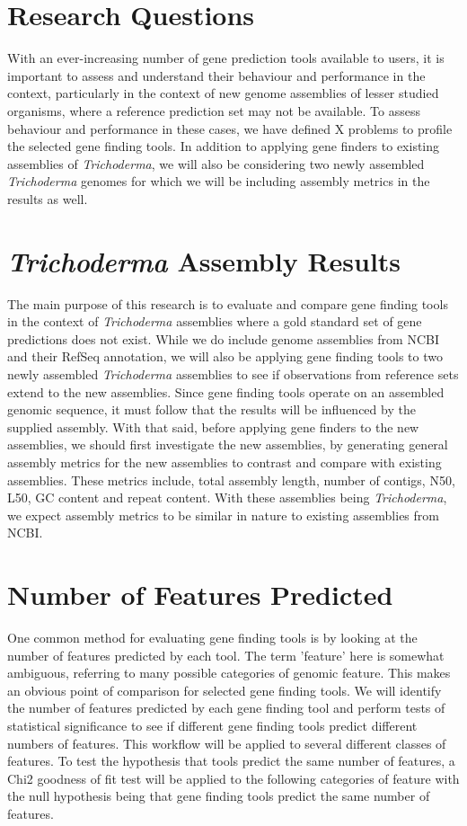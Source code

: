 \section{Research Questions}

With an ever-increasing number of gene prediction tools available to
users, it is important to assess and understand their behaviour and
performance in the context, particularly in the context of new genome
assemblies of lesser studied organisms, where a reference prediction
set may not be available. To assess behaviour and performance in these
cases, we have defined X problems to profile the selected gene finding
tools. In addition to applying gene finders to existing assemblies of
\textit{Trichoderma}, we will also be considering two newly assembled
\textit{Trichoderma} genomes for which we will be including assembly
metrics in the results as well.

\section{\textit{Trichoderma} Assembly Results}

The main purpose of this research is to evaluate and compare gene
finding tools in the context of \textit{Trichoderma} assemblies where
a gold standard set of gene predictions does not exist. While we do
include genome assemblies from NCBI and their RefSeq annotation, we
will also be applying gene finding tools to two newly assembled
\textit{Trichoderma} assemblies to see if observations from reference
sets extend to the new assemblies. Since gene finding tools operate on
an assembled genomic sequence, it must follow that the results will be
influenced by the supplied assembly. With that said, before applying
gene finders to the new assemblies, we should first investigate the
new assemblies, by generating general assembly metrics for the new
assemblies to contrast and compare with existing assemblies. These
metrics include, total assembly length, number of contigs, N50, L50,
GC content and repeat content. With these assemblies being
\textit{Trichoderma}, we expect assembly metrics to be similar in
nature to existing assemblies from NCBI.

\section{Number of Features Predicted}

One common method for evaluating gene finding tools is by looking at
the number of features predicted by each tool. The term 'feature' here
is somewhat ambiguous, referring to many possible categories of
genomic feature. This makes an obvious point of comparison for
selected gene finding tools. We will identify the number of features
predicted by each gene finding tool and perform tests of statistical
significance to see if different gene finding tools predict different
numbers of features. This workflow will be applied to several
different classes of features. To test the hypothesis that tools
predict the same number of features, a Chi2 goodness of fit test will
be applied to the following categories of feature with the null
hypothesis being that gene finding tools predict the same number of
features.

